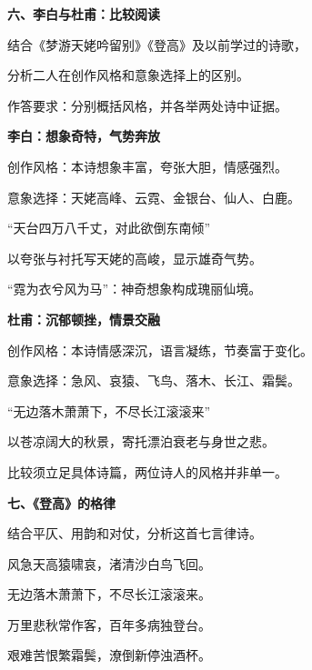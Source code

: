 \documentclass[UTF8,10pt,aspectratio=169]{ctexbeamer}
\newcommand{\PageHeading}[1]{\begin{center}{\Large\bfseries #1}\end{center}\vspace{0.2cm}}
\begin{document}
\begin{frame}
\PageHeading{六、李白与杜甫：比较阅读}
结合《梦游天姥吟留别》《登高》及以前学过的诗歌，\par\vspace{0.23cm}
分析二人在创作风格和意象选择上的区别。\par\vspace{0.23cm}
作答要求：分别概括风格，并各举两处诗中证据。\par\vspace{0.23cm}
\end{frame}
\begin{frame}
\PageHeading{李白：想象奇特，气势奔放}
创作风格：本诗想象丰富，夸张大胆，情感强烈。\par\vspace{0.23cm}
意象选择：天姥高峰、云霓、金银台、仙人、白鹿。\par\vspace{0.23cm}
“天台四万八千丈，对此欲倒东南倾”\par\vspace{0.23cm}
以夸张与衬托写天姥的高峻，显示雄奇气势。\par\vspace{0.23cm}
“霓为衣兮风为马”：神奇想象构成瑰丽仙境。\par\vspace{0.23cm}
\end{frame}
\begin{frame}
\PageHeading{杜甫：沉郁顿挫，情景交融}
创作风格：本诗情感深沉，语言凝练，节奏富于变化。\par\vspace{0.23cm}
意象选择：急风、哀猿、飞鸟、落木、长江、霜鬓。\par\vspace{0.23cm}
“无边落木萧萧下，不尽长江滚滚来”\par\vspace{0.23cm}
以苍凉阔大的秋景，寄托漂泊衰老与身世之悲。\par\vspace{0.23cm}
比较须立足具体诗篇，两位诗人的风格并非单一。\par\vspace{0.23cm}
\end{frame}
\begin{frame}
\PageHeading{七、《登高》的格律}
结合平仄、用韵和对仗，分析这首七言律诗。\par\vspace{0.23cm}
风急天高猿啸哀，渚清沙白鸟飞回。\par\vspace{0.23cm}
无边落木萧萧下，不尽长江滚滚来。\par\vspace{0.23cm}
万里悲秋常作客，百年多病独登台。\par\vspace{0.23cm}
艰难苦恨繁霜鬓，潦倒新停浊酒杯。\par\vspace{0.23cm}
\end{frame}
\end{document}
